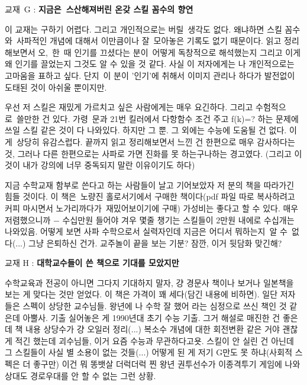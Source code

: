 교재 G : \textbf{지금은 스산해져버린 온갖 스킬 꼼수의 향연}
\vspace{5mm}

이 교재는 구하기 어렵다. 그리고 개인적으로는 버릴 생각도 없다.
왜냐하면 스킬 꼼수와 사파적인 개념에 대해서 이만큼이나 잘 모아놓은 기록도 없기 때문이다.
읽고 정리해보면서 오, 한 때 인기를 끄셨다는 분이 어떻게 독창적으로 해석했는지 그리고 이게 왜 인기를 끌었는지 그것도 알 수 있을 것 같다.
사실 이 저자에게는 나 개인적으로는 고마움을 표하고 싶다. 단지 이 분이 '인기'에 취해서 이미지 관리나 하다가 발전없이 도태된 것이 아쉬울 뿐이지만.
\vspace{5mm}

우선 저 스킬은 재밌게 가르치고 싶은 사람에게는 매우 요긴하다.
그리고 수험적으로 쓸만한 건 있다. 가령 문과 21번 킬러에서 다항함수 조건 주고 f(k)=? 하는 문제에 쓰일 스킬 같은 것이 다 나와있다.
하지만 그 뿐. 그 외에는 수능에 도움될 건 없다. 이게 상당히 유감스럽다.
끝까지 읽고 정리해보면서 느낀 건 한편으로 매우 감사하다는 것, 그러나 다른 한편으로는 사파로 가면 진화를 못 하는구나하는 경고였다.
(그리고 이것이 내가 강의에 너무 중독되지 말란 이유이기도 하다)
\vspace{5mm}

지금 수학교재 함부로 쓴다고 하는 사람들이 날고 기어보았자 저 분의 책을 따라가긴 힘들 것이다.
이 책은 노량진 홀로서기에서 구매한 책이다(pdf 파일 따로 복사하려고 커피 마시면서 노가리까다가 재밌어보이기에 구매)
가성비는 좋다고 할 수 있다. 매우 저렴했으니까 $-$ 수십만원 들어야 겨우 몇줄 챙기는 스킬들이 2만원 내에로 수십개는 나와있음.
어떻게 보면 사파 수학으로서 실력자인데 지금은 어디서 뭐하는지 알 수 없다(...) 그냥 은퇴하신 건가.
교주놀이 끝을 보는 기분?
잠깐, 이거 뒷담화 맞긴해?
\vspace{5mm}

교재 H : \textbf{대학교수들이 쓴 책으로 기대를 모았지만}
\vspace{5mm}

수학교육과 전공이 아니면 그다지 기대하지 말자, 걍 경문사 책이나 보거나 일본책을 보는 게 맞다는 것만 얻었다.
이 책은 가격이 꽤 세다(담긴 내용에 비하면). 일단 저자들은 스펙이 상당한 교수님들.
왕년에 나 수학 잘 했어 라는 심정으로 쓰신 책인 것 같은데 아뿔사.
기출 실어놓은 게 1990년대 초기 수능 기출. 그거 해설로 매진한 건 좋은데 책 내용 상당수가 걍 오일러 정리(...)
복소수 개념에 대한 회전변환 같은 거야 괜찮게 적긴 했는데 괴수님들, 이거 요즘 수능과 무관하다고욧.
스킬이 안 실린 건 아닌데 그 스킬들이 사실 별 소용이 없는 것들(...) 어떻게 된 게 저기 G만도 못 하냐(사회적 스펙은 더 좋구만)
이건 뭐 똥뱃살 더럭더럭 찐 왕년 권투선수가 이종격투기 게임에 나와 상대도 경로우대를 안 할 수 없는 그런 상황.
\vspace{5mm}

